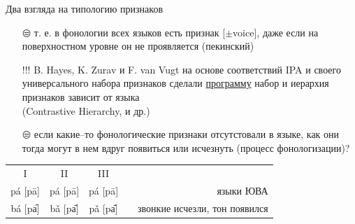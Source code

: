 \begin{frame}{Два взгляда на типологию признаков}
\vspace{-2mm}
\begin{itemize}
\mytem устройство признаков универсально: в разных языках представлена лишь часть возможного инвентаря\\(Feature Geometry \citep{clements85} и др.)
\item[\texttt{😒}] т. е. в фонологии всех языков есть признак [$\pm$voice], даже если на поверхностном уровне он не проявляется (пекинский) 
\item[!!!] B. Hayes, K. Zurav и F. van Vugt на основе соответствий IPA и своего универсального набора признаков сделали \href{http://www.linguistics.ucla.edu/people/hayes/120a/Pheatures/Pheatures.jar}{программу}
\vfill
\mytem набор и иерархия признаков зависит от языка\\(Contrastive
Hierarchy, \citep{dresher03} и др.)
\item[\texttt{😒}] если какие–то фонологические признаки отсутстовали в языке, как они тогда могут в нем вдруг появиться или исчезнуть (процесс фонологизации)?
\end{itemize}
\begin{tabular}{cccrr}
I & II &  III && \citep{matisoff73} \\
pá [pā] & pá [pā] & pá [pā] && языки ЮВА\\ 
bá [pa᷇] & bǎ [pa᷄] & pǎ [pa᷄] && звонкие исчезли, тон появился \\ 
\end{tabular}
\end{frame}

